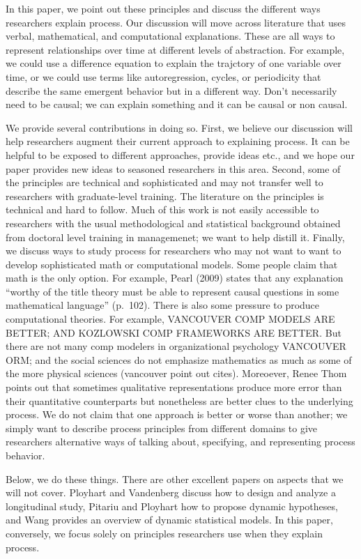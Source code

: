\documentclass[english,,man]{apa6}
\theoremstyle{definition}
\theoremstyle{definition}
\theoremstyle{definition}
\theoremstyle{remark}
\begin{document}
In this paper, we point out these principles and discuss the different
ways researchers explain process. Our discussion will move across
literature that uses verbal, mathematical, and computational
explanations. These are all ways to represent relationships over time at
different levels of abstraction. For example, we could use a difference
equation to explain the trajctory of one variable over time, or we could
use terms like autoregression, cycles, or periodicity that describe the
same emergent behavior but in a different way. Don't necessarily need to
be causal; we can explain something and it can be causal or non causal.

We provide several contributions in doing so. First, we believe our
discussion will help researchers augment their current approach to
explaining process. It can be helpful to be exposed to different
approaches, provide ideas etc., and we hope our paper provides new ideas
to seasoned researchers in this area. Second, some of the principles are
technical and sophisticated and may not transfer well to researchers
with graduate-level training. The literature on the principles is
technical and hard to follow. Much of this work is not easily accessible
to researchers with the usual methodological and statistical background
obtained from doctoral level training in managemenet; we want to help
distill it. Finally, we discuss ways to study process for researchers
who may not want to want to develop sophisticated math or computational
models. Some people claim that math is the only option. For example,
Pearl (2009) states that any explanation \enquote{worthy of the title
theory must be able to represent causal questions in some mathematical
language} (p.~102). There is also some pressure to produce computational
theories. For example, VANCOUVER COMP MODELS ARE BETTER; AND KOZLOWSKI
COMP FRAMEWORKS ARE BETTER. But there are not many comp modelers in
organizational psychology VANCOUVER ORM; and the social sciences do not
emphasize mathematics as much as some of the more physical sciences
(vancouver point out cites). Moreoever, Renee Thom points out that
sometimes qualitative representations produce more error than their
quantitative counterparts but nonetheless are better clues to the
underlying process. We do not claim that one approach is better or worse
than another; we simply want to describe process principles from
different domains to give researchers alternative ways of talking about,
specifying, and representing process behavior.

Below, we do these things. There are other excellent papers on aspects
that we will not cover. Ployhart and Vandenberg discuss how to design
and analyze a longitudinal study, Pitariu and Ployhart how to propose
dynamic hypotheses, and Wang provides an overview of dynamic statistical
models. In this paper, conversely, we focus solely on principles
researchers use when they explain process.
\end{document}
